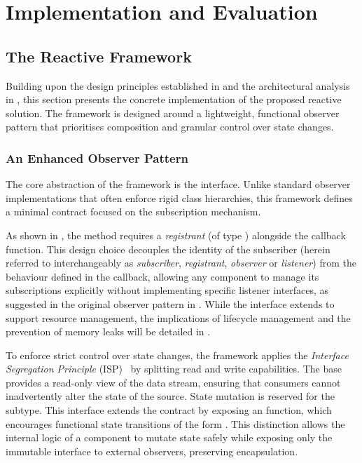 \chapter{Implementation and Evaluation}\label{ch:impl_eval}

\section{The Reactive Framework}
Building upon the design principles established in
 and the architectural analysis in
, this section presents the concrete implementation of the
proposed reactive solution. The framework is designed around a lightweight,
functional observer pattern that prioritises composition and granular control
over state changes.

\subsection{An Enhanced Observer Pattern}
The core abstraction of the framework is the  interface.
Unlike standard observer implementations that often enforce rigid class
hierarchies, this framework defines a minimal contract focused on the
subscription mechanism.


As shown in , the  method requires a
\emph{registrant} (of type ) alongside the callback function. This
design choice decouples the identity of the subscriber (herein referred to
interchangeably as \emph{subscriber}, \emph{registrant}, \emph{observer} or
\emph{listener}) from the behaviour defined in the callback, allowing any
component to manage its subscriptions explicitly without implementing specific
listener interfaces, as suggested in the original observer pattern in
\cite{gamma1994design}. While the interface extends  to
support resource management, the implications of lifecycle management and the
prevention of memory leaks will be detailed in .

To enforce strict control over state changes, the framework applies the
\emph{Interface Segregation Principle} (ISP)~\cite{martin2003agile} by
splitting read and write capabilities. The base  provides
a read-only view of the data stream, ensuring that consumers cannot
inadvertently alter the state of the source. State mutation is reserved for the
 subtype. This interface extends the contract by
exposing an  function, which encourages functional state
transitions of the form . This distinction allows the internal
logic of a component to mutate state safely while exposing only the immutable
 interface to external observers, preserving encapsulation.

